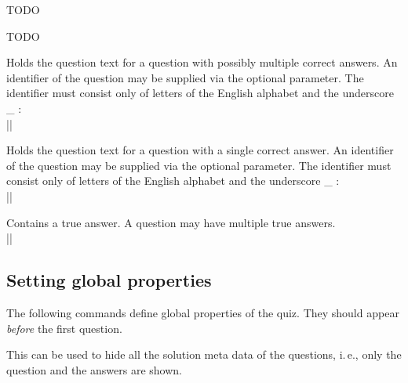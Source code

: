 \documentclass[a4paper,10pt]{ltxdoc}
\begin{document}

\DescribeMacro{\intro} TODO

\DescribeMacro{\keepme} TODO

\DescribeMacro{\question} Holds the question text for a question with
possibly multiple correct answers.
An identifier of the
question may be supplied via the optional parameter. The identifier must
consist only of letters of the English alphabet and the underscore \_ :\\
||

\DescribeMacro{\questionSc}
Holds the question text for a question with a single correct answer.
An identifier of the
question may be supplied via the optional parameter. The identifier must
consist only of letters of the English alphabet and the underscore \_ :\\
||


\DescribeMacro{\true} Contains a true answer. A question may have multiple
true answers.\\
||



\subsection{Setting global properties}
The following commands define global properties of the quiz. They should
appear \emph{before} the first question.

\DescribeMacro{\hidesolution} This can be used to hide all the solution meta
data of the questions, i.\,e., only the question and the answers are shown.
\end{document}
